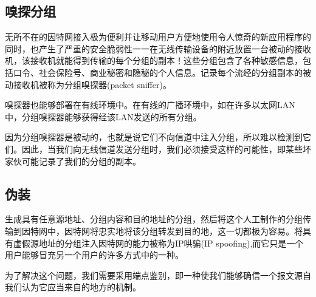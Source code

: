 \subsection{嗅探分组}

    无所不在的因特网接入极为便利并让移动用户方便地使用令人惊奇的新应用程序的同时，也产生了严重的安全脆弱性一一在无线传输设备的附近放置一台被动的接收机，该接收机就能得到传输的每个分组的副本！这些分组包含了各种敏感信息，包括口令、社会保险号、商业秘密和隐秘的个人信息。记录每个流经的分组副本的被动接收机被称为分组嗅探器(packet sniffer)。

    嗅探器也能够部署在有线环境中。在有线的广播环境中，如在许多以太网LAN中，分组嗅探器能够获得经该LAN发送的所有分组。

    因为分组嗅探器是被动的，也就是说它们不向信道中注入分组，所以难以检测到它们。因此，当我们向无线信道发送分组时，我们必须接受这样的可能性，即某些坏家伙可能记录了我们的分组的副本。

\subsection{伪装}

    生成具有任意源地址、分组内容和目的地址的分组，然后将这个人工制作的分组传输到因特网中，因特网将忠实地将该分组转发到目的地，这一切都极为容易。将具有虚假源地址的分组注入因特网的能力被称为IP哄骗(IP spoofing),而它只是一个用户能够冒充另一个用户的许多方式中的一种。

    为了解决这个问题，我们需要采用端点鉴别，即一种使我们能够确信一个报文源自我们认为它应当来自的地方的机制。

    